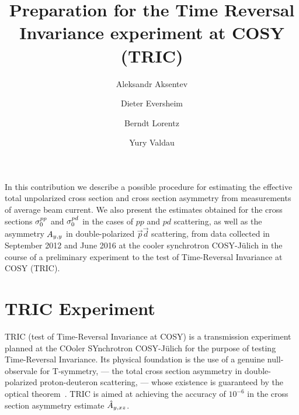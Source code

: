 \documentclass[reprint, superscriptaddress]{revtex4-1}
\begin{document}
\title{Preparation for the Time Reversal Invariance experiment at COSY (TRIC)}
\author{Aleksandr Aksentev}
\author{Dieter Eversheim}
\author{Berndt Lorentz}
\author{Yury Valdau}

\maketitle

\captionsetup[figure]{labelfont=bf,textfont=normalfont,singlelinecheck=off,justification=raggedright}

	
	
\begin{abstractname}
 In this contribution we describe a possible procedure for estimating the effective total unpolarized cross section and cross section asymmetry from measurements of average beam current. We also present the estimates obtained for the cross sections $\CS[0]^{pp}$ and $\CS[0]^{pd}$ in the cases of $pp$ and $pd$ scattering, as well as the asymmetry $\Ayy$ in double-polarized $\vec{p}\vec{d}$ scattering, from data collected in September 2012 and June 2016 at the cooler synchrotron COSY-J\"ulich in the course of a preliminary experiment to the test of Time-Reversal Invariance at COSY (TRIC). 
\end{abstractname}

\section{TRIC Experiment}

TRIC (test of Time-Reversal Invariance at COSY) is a transmission experiment planned at the COoler SYnchrotron COSY-J\"ulich for the purpose of testing Time-Reversal Invariance. Its physical foundation is the use of a genuine null-observale for T-symmetry, --- the total cross section asymmetry in double-polarized proton-deuteron scattering, --- whose existence is guaranteed by the optical theorem~\cite{Conzett}. TRIC is aimed at achieving the accuracy of $10^{-6}$ in the cross section asymmetry estimate $\Ayxz*$.
\end{document}
